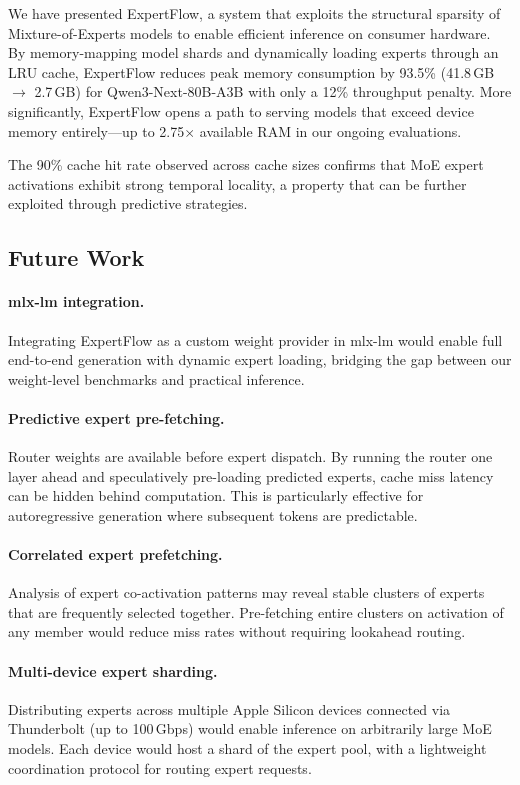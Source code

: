 \documentclass[11pt,a4paper]{article}
\begin{document}
We have presented ExpertFlow, a system that exploits the structural sparsity
of Mixture-of-Experts models to enable efficient inference on consumer
hardware. By memory-mapping model shards and dynamically loading experts
through an LRU cache, ExpertFlow reduces peak memory consumption by 93.5\%
(41.8\,GB $\rightarrow$ 2.7\,GB) for Qwen3-Next-80B-A3B with only a 12\%
throughput penalty. More significantly, ExpertFlow opens a path to serving
models that exceed device memory entirely---up to 2.75$\times$ available RAM
in our ongoing evaluations.

The 90\% cache hit rate observed across cache sizes confirms that MoE expert
activations exhibit strong temporal locality, a property that can be further
exploited through predictive strategies.

\subsection{Future Work}

\paragraph{mlx-lm integration.} Integrating ExpertFlow as a custom weight
provider in mlx-lm would enable full end-to-end generation with dynamic expert
loading, bridging the gap between our weight-level benchmarks and practical
inference.

\paragraph{Predictive expert pre-fetching.} Router weights are available
before expert dispatch. By running the router one layer ahead and
speculatively pre-loading predicted experts, cache miss latency can be hidden
behind computation. This is particularly effective for autoregressive
generation where subsequent tokens are predictable.

\paragraph{Correlated expert prefetching.} Analysis of expert co-activation
patterns may reveal stable clusters of experts that are frequently selected
together. Pre-fetching entire clusters on activation of any member would
reduce miss rates without requiring lookahead routing.

\paragraph{Multi-device expert sharding.} Distributing experts across multiple
Apple Silicon devices connected via Thunderbolt (up to 100\,Gbps) would enable
inference on arbitrarily large MoE models. Each device would host a shard of
the expert pool, with a lightweight coordination protocol for routing expert
requests.
\end{document}
